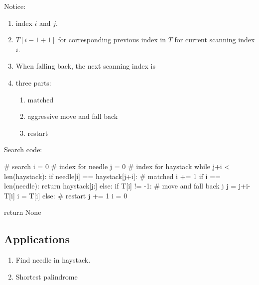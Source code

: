 Notice:
\begin{enumerate}
\item index $i$ and $j$.
\item $T[i-1+1]$ for corresponding previous index in $T$ for current scanning index $i$. 
\item When falling back, the next scanning index is 
\item three parts:
\begin{enumerate}
\item matched
\item aggressive move and fall back
\item restart 
\end{enumerate}
\end{enumerate}
Search code: 
\begin{python}
# search
i = 0  # index for needle 
j = 0  # index for haystack
while j+i < len(haystack):
    if needle[i] == haystack[j+i]:  # matched 
        i += 1
        if i == len(needle):
            return haystack[j:]
    else:
        if T[i] != -1:  # move and fall back j
            j = j+i-T[i]
            i = T[i]
        else:  # restart
            j += 1
            i = 0

return None
\end{python}
\subsection{Applications}
\begin{enumerate}
\item Find needle in haystack. 
\item Shortest palindrome 
\end{enumerate}

